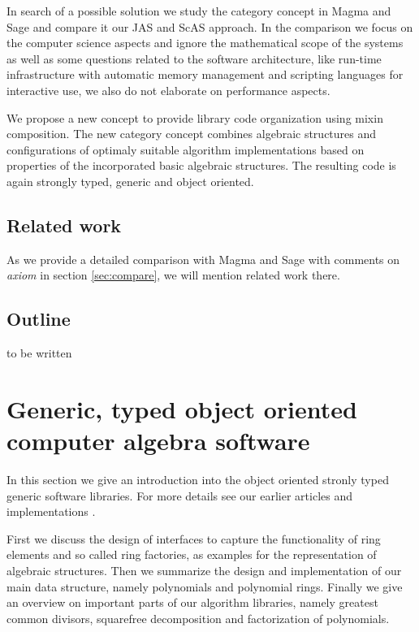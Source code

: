 \documentclass{llncs}
\begin{document}
In search of a possible solution we study the category concept in
Magma \cite{BosmaCannonPlayoust:1997} and Sage \cite{Stein:2005} and
compare it our JAS and ScAS approach. In the comparison we focus on
the computer science aspects and ignore the mathematical scope of the
systems as well as some questions related to the software
architecture, like run-time infrastructure with automatic memory
management and scripting languages for interactive use, we also do not
elaborate on performance aspects.

We propose a new concept to provide library code organization
using mixin composition. The new category concept combines algebraic
structures and configurations of optimaly suitable algorithm
implementations based on properties of the incorporated basic
algebraic structures.  The resulting code is again strongly typed,
generic and object oriented.


\subsection{Related work} %

As we provide a detailed comparison with Magma
\cite{BosmaCannonPlayoust:1997} and Sage \cite{Stein:2005} with
comments on {\em axiom} \cite{JenksSutor:1992,Watt:2003} in section
\ref{sec:compare}, we will mention related work there.


\subsection{Outline} %

to be written


\section{Generic, typed object oriented computer algebra software} %
\label{sec:asto}

In this section we give an introduction into the object oriented
stronly typed generic software libraries. For more details see our
earlier articles and implementations
\cite{JollyKredel:2009,JollyKredel:2010,Jolly:2010,Kredel:2011,Kredel:2008}. %

First we discuss the design of interfaces to capture the functionality
of ring elements and so called ring factories, as examples for the
representation of algebraic structures. Then we summarize the design
and implementation of our main data structure, namely polynomials and
polynomial rings. Finally we give an overview on important parts of
our algorithm libraries, namely greatest common divisors, squarefree
decomposition and factorization of polynomials.
\end{document}
